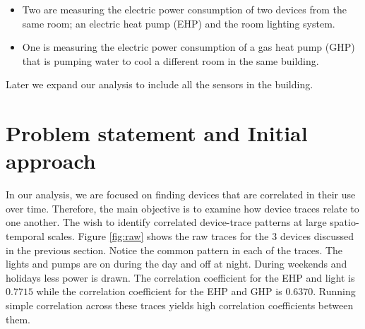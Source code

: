 \begin{itemize}
 \item Two are measuring the electric power consumption of two devices from the same room; an electric heat 
 		pump (EHP) and the room lighting system.
 \item One is measuring the electric power consumption of a gas heat pump (GHP) that is pumping water to cool 
 		a different room in the same building.
\end{itemize}

Later we expand our analysis to include all the sensors in the building.








\section{Problem statement and Initial approach}\label{problem}
In our analysis, we are focused on finding devices that are correlated in their use over time.  Therefore, the
main objective is to examine how device traces relate to one another.  The wish to identify
correlated device-trace patterns at large spatio-temporal scales.  
Figure \ref{fig:raw} shows the raw traces for the 3 devices discussed in the previous section.
Notice the common pattern in each of the traces.  The lights and pumps are on during the day and off at night.
During weekends and holidays less power is drawn.  The correlation coefficient for 
 the EHP and light is $0.7715$ while the correlation coefficient for the EHP and GHP is $0.6370$.
Running simple correlation across these traces yields high correlation coefficients between them.


